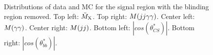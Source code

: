 \begin{figure}[thb]
  \caption{Distributions of data and MC for the signal region with the blinding region removed. Top left: $\tilde{M}_{\mathrm{X}}$. Top right: $M(jj\gamma\gamma)$. Center left: $M(\gamma\gamma)$. Center right: $M(jj)$. Bottom left: $|cos(\theta^{*}_{CS})|$. Bottom right: $|cos(\theta^{*}_{bb})|$.}
\label{fig:cp_mgg1}
\end{figure}


